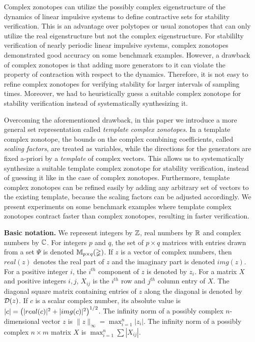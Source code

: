 Complex zonotopes can utilize the possibly complex eigenstructure
of the dynamics of linear impulsive systems to define
contractive sets for stability verification.  This is an advantage
over polytopes or usual zonotopes that can only utilize the real
eigenstructure but not the complex eigenstructure.  For stabililty
verification of nearly periodic linear impulsive systems, complex
zonotopes demonstrated good accuracy on some benchmark examples.
However, a drawback of complex zonotopes is that adding more
generators to it can violate the property of contraction with respect
to the dynamics.  Therefore, it is not easy to refine complex
zonotopes for verifying stability for larger intervals of sampling
times.  Moreover, we had to heuristically guess a suitable complex
zonotope for stability verification instead of systematically
synthesizing it.

Overcoming the aforementioned drawback, in this paper we introduce a
more general set representation called \emph{template complex
zonotopes}.  In a {template complex zonotope}, the bounds on the
complex combining coefficients, called \emph{scaling factors}, are
treated as variables, while the directions for the generators are
fixed a-priori by a \emph{template} of complex vectors.  This allows
us to systematically synthesize a suitable template complex zonotope
for stability verification, instead of guessing it like in the case of
complex zonotopes.  Furthermore, template complex zonotopes can be
refined easily by adding any arbitrary set of vectors to the existing
template, because the scaling factors can be adjusted accordingly.  We
present experiments on some benchmark examples where template complex
zonotopes contract faster than complex zonotopes, resulting in faster
verification.

{\bf Basic notation.} We represent integers by $\mathbb{Z}$, real numbers
by $\mathbb{R}$ and complex numbers by $\mathbb{C}$.  For integers $p$ and
$q$, the set of $p\times q$ matrices with entries drawn from a set
$\Psi$ is denoted $\mathbb{M}_{p\times q}(\mathbb{\Psi})$.  If $z$ is a vector of complex
numbers, then $real(z)$ denotes the real part of $z$ and the imaginary
part is denoted $img(z)$.  For a positive integer $i$, the $i^{th}$
component of $z$ is denoted by $z_i$.  For a matrix $X$ and positive
integers $i, j$, $X_{ij}$ is the $i^{th}$ row and $j^{th}$ column
entry of $X$. The diagonal square matrix containing entries of $z$
along the diagonal is denoted by $\mathcal{D}(z)$.  If $c$ is a scalar complex
number, its absolute value is
$|c|=\left(|real(c)|^2+|img(c)|^2\right)^{1/2}$.  The infinity norm of a
possibly complex $n$-dimensional vector $z$ is
$\|z\|_{\infty}=\max_{i=1}^n{|z_i|}$. The infinity norm of a possibly
complex $n\times m$ matrix $X$ is $\max_{i=1}^{n}\sum{|X_{ij}|}$.

